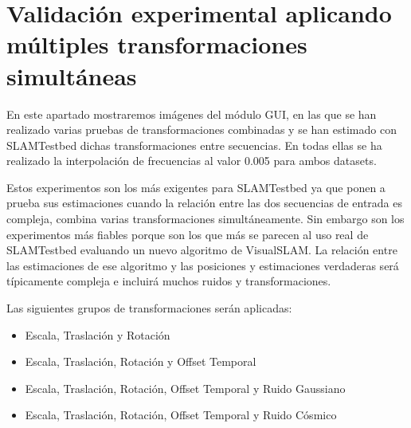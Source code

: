 \section{Validación experimental aplicando múltiples transformaciones simultáneas}

En este apartado mostraremos imágenes del módulo GUI, en las que se han realizado varias pruebas de transformaciones combinadas y se han estimado con SLAMTestbed dichas transformaciones entre secuencias.
En todas ellas se ha realizado la interpolación de frecuencias al valor 0.005 para ambos datasets.

Estos experimentos son los más exigentes para SLAMTestbed ya que ponen a prueba sus estimaciones cuando la relación entre las dos secuencias de entrada es compleja, combina varias transformaciones simultáneamente. Sin embargo son los experimentos más fiables porque son los que más se parecen al uso real de SLAMTestbed evaluando un nuevo algoritmo de VisualSLAM. La relación entre las estimaciones de ese algoritmo y las posiciones y estimaciones verdaderas será típicamente compleja e incluirá muchos ruidos y transformaciones.

Las siguientes grupos de transformaciones serán aplicadas:
\begin{itemize}
	\item{Escala, Traslación y Rotación}
	\item{Escala, Traslación, Rotación y Offset Temporal}
	\item{Escala, Traslación, Rotación, Offset Temporal y Ruido Gaussiano}
	\item{Escala, Traslación, Rotación, Offset Temporal y Ruido Cósmico}
\end{itemize}

